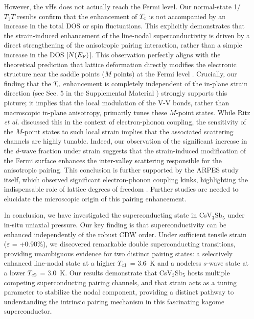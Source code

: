 \documentclass[aps,prl,twocolumn,superscriptaddress]{revtex4-2}
\begin{document}
 However, the vHs does not actually reach the Fermi level. Our normal-state 1/$T_1T$ results confirm that the enhancement of $T_{\rm c}$ is not accompanied by an increase in the total DOS or spin fluctuations.  This explicitly demonstrates that the strain-induced enhancement of the line-nodal superconductivity is driven by a direct strengthening of the anisotropic pairing interaction, rather than a simple increase in the DOS [$N(E_{\rm F})$]. This observation perfectly aligns with the theoretical prediction that lattice deformation directly modifies the electronic structure near the saddle points ($M$ points) at the Fermi level \cite{Fernandes_PRB}. Crucially, our finding that the $T_{\rm c}$ enhancement is completely independent of the in-plane strain direction (see Sec. 5 in the Supplemental Material \cite{SM}) strongly supports this picture; it implies that the local modulation of the V-V bonds, rather than macroscopic in-plane anisotropy, primarily tunes these $M$-point states. While Ritz {\it et al.} \cite{Fernandes_PRB} discussed this in the context of electron-phonon coupling, the sensitivity of the $M$-point states to such local strain implies that the associated scattering channels are highly tunable. Indeed, our observation of the significant increase in the $d$-wave fraction under strain suggests that the strain-induced modification of the Fermi surface enhances the inter-valley scattering responsible for the anisotropic pairing. This conclusion is further supported by the ARPES study itself, which observed significant electron-phonon coupling kinks, highlighting the indispensable role of lattice degrees of freedom \cite{ChangNatCom}. Further studies are needed to elucidate the microscopic origin of this pairing enhancement.



In conclusion, we have investigated the superconducting state in CsV$_3$Sb$_5$ under in-situ uniaxial pressure. Our key finding is that superconductivity can be enhanced independently of the robust CDW order. Under sufficient tensile strain ($\varepsilon$ = +0.90\%), we discovered remarkable double superconducting transitions, providing unambiguous evidence for two distinct pairing states: a selectively enhanced line-nodal state at a higher $T_{\rm c1}$ = 3.6~K and a nodeless $s$-wave state at a lower $T_{\rm c2}$ = 3.0~K. Our results demonstrate that CsV$_3$Sb$_5$ hosts multiple competing superconducting pairing channels, and that strain acts as a tuning parameter to stabilize the nodal component,  providing a distinct pathway to understanding the intrinsic pairing mechanism in this fascinating kagome superconductor.
\end{document}
